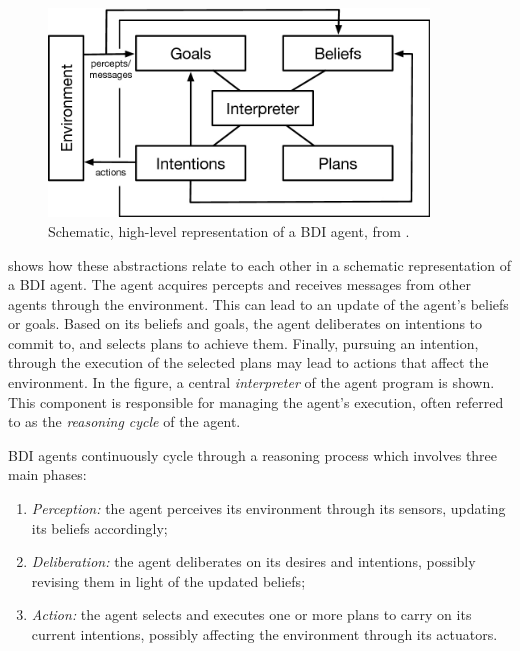 \begin{figure}[t]
    \centering
    \includegraphics[width=0.9\textwidth]{figures/bdi-agent-schema.png}
    \caption{Schematic, high-level representation of a \ac{BDI} agent, from \cite{Bordini_El_Fallah_Seghrouchni_Hindriks_Logan_Ricci_2020}.}
    \label{fig:bdi-model}
\end{figure}


 shows how these abstractions relate to each other in a schematic representation of a \ac{BDI} agent.
%
The agent acquires percepts and receives messages from other agents through the environment. This can lead to an update of the agent's beliefs or goals.
%
Based on its beliefs and goals, the agent deliberates on intentions to commit to, and selects plans to achieve them. 
%
Finally, pursuing an intention, through the execution of the selected plans may lead to actions that affect the environment. 
%
In the figure, a central \emph{interpreter} of the agent program is shown. 
%
This component is responsible for managing the agent's execution, often referred to as the \emph{reasoning cycle} of the agent.

\ac{BDI} agents continuously cycle through a reasoning process which involves three main phases:
\begin{enumerate}
    \item \emph{Perception:} the agent perceives its environment through its sensors, updating its beliefs accordingly;

    \item \emph{Deliberation:} the agent deliberates on its desires and intentions,
    possibly revising them in light of the updated beliefs;

    \item \emph{Action:} the agent selects and executes one or more plans to carry on its current intentions,
    possibly affecting the environment through its actuators.
\end{enumerate}

